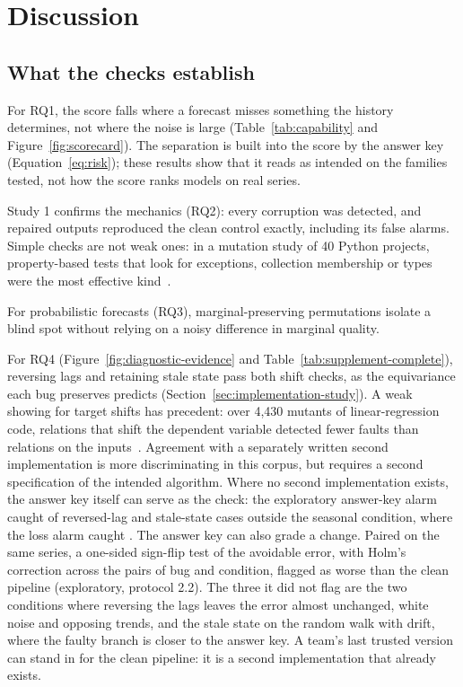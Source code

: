 \documentclass[11pt,a4paper]{article}
\begin{document}
\section{Discussion}
\label{sec:discussion}

\subsection{What the checks establish}

For RQ1, the score falls where a forecast misses something the history
determines, not where the noise is large (Table~\ref{tab:capability} and
Figure~\ref{fig:scorecard}). The separation is built into the score by the
answer key (Equation~\eqref{eq:risk}); these results show that it reads
as intended on the families tested, not how the score ranks models on
real series.

Study 1 confirms the mechanics (RQ2): every corruption
was detected, and repaired outputs reproduced the clean control exactly,
including its false alarms.
Simple checks are not weak ones: in a mutation study of 40 Python
projects, property-based tests that look for exceptions, collection
membership or types were the most effective
kind~\cite{ravi2025empirical}.

For probabilistic forecasts (RQ3), marginal-preserving permutations isolate a
blind spot without relying on a noisy difference in marginal quality.

For RQ4 (Figure~\ref{fig:diagnostic-evidence} and
Table~\ref{tab:supplement-complete}), reversing lags and retaining stale
state pass both shift checks, as the equivariance each bug preserves
predicts (Section~\ref{sec:implementation-study}). A weak showing for target shifts
has precedent: over 4,430 mutants of linear-regression code, relations
that shift the dependent variable detected fewer faults than relations on
the inputs~\cite{luu2021testing}. Agreement with a separately
written second implementation is more discriminating in this corpus, but
requires a second specification of the intended algorithm.
Where no second implementation exists,
the answer key itself can serve as the check: the exploratory answer-key
alarm caught \AnswerKeySubtleAlarms{} of \SubtleCases{} reversed-lag and
stale-state cases outside the seasonal condition, where the loss alarm
caught \LossSubtleAlarms{}. The answer key can also grade a change.
Paired on the same series, a one-sided sign-flip test of the avoidable
error, with Holm's correction across the \PairedPairs{} pairs of bug and
condition, flagged \PairedFlagged{} as worse than the clean pipeline
(exploratory, protocol 2.2). The three it did not flag are the two
conditions where reversing the lags leaves the error almost unchanged,
white noise and opposing trends, and the stale state on the random walk
with drift, where the faulty branch is closer to the answer key. A team's
last trusted version can stand in for the clean pipeline: it is a second
implementation that already exists.
\end{document}
